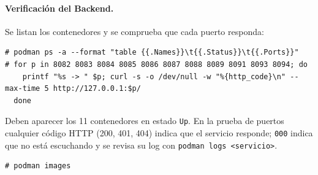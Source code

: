 \paragraph{Verificación del Backend.} Se listan los contenedores y se comprueba que cada puerto responda:
\begin{lstlisting}
# podman ps -a --format "table {{.Names}}\t{{.Status}}\t{{.Ports}}"
# for p in 8082 8083 8084 8085 8086 8087 8088 8089 8091 8093 8094; do
    printf "%s -> " $p; curl -s -o /dev/null -w "%{http_code}\n" --max-time 5 http://127.0.0.1:$p/
  done
\end{lstlisting}
Deben aparecer los 11 contenedores en estado \texttt{Up}. En la prueba de puertos cualquier código HTTP (200, 401, 404) indica que el servicio responde; \texttt{000} indica que no está escuchando y se revisa su log con \texttt{podman logs <servicio>}.
\begin{lstlisting}
# podman images
\end{lstlisting}
